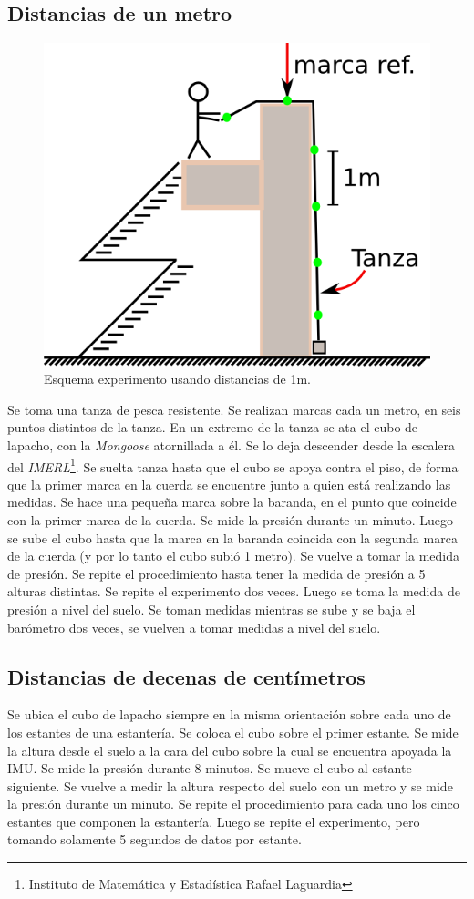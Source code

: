 \documentclass[main]{subfiles}
\begin{document}
\subsection{Distancias de un metro}

\begin{figure}
\hspace{20pt}
  \includegraphics[width=.5\textwidth]{./pics_barom/imerl.png}
  \caption{Esquema experimento usando distancias de 1m.}
  \label{fig:imerl.png}
\end{figure}

Se toma una tanza de pesca resistente. Se realizan marcas cada un metro, en seis puntos distintos de la tanza. En un extremo de la tanza se ata el cubo de lapacho, con la \emph{Mongoose} atornillada a él. Se lo deja descender desde la escalera del \emph{IMERL}\footnote{Instituto de Matemática y Estadística Rafael Laguardia}. Se suelta tanza hasta que el cubo se apoya contra el piso, de forma que la primer marca en la cuerda se encuentre junto a quien está realizando las medidas. Se hace una pequeña marca sobre la baranda, en el punto que coincide con la primer marca de la cuerda. Se mide la presión durante un minuto. Luego se sube el cubo hasta que la marca en la baranda coincida con la segunda marca de la cuerda (y por lo tanto el cubo subió 1 metro). Se vuelve a tomar la medida de presión. Se repite el procedimiento hasta tener la medida de presión a 5 alturas distintas. 
Se repite el experimento dos veces. Luego se toma la medida de presión a nivel del suelo. Se toman medidas mientras se sube y se baja el barómetro dos veces, se vuelven a tomar medidas a nivel del suelo.

\subsection{Distancias de decenas de centímetros}

Se ubica el cubo de lapacho siempre en la misma orientación sobre cada uno de los estantes de una estantería. Se coloca el cubo sobre el primer estante. Se mide la altura desde el suelo a la cara del cubo sobre la cual se encuentra apoyada la IMU. Se mide la presión durante 8 minutos. Se mueve el cubo al estante siguiente. Se vuelve a medir la altura respecto del suelo con un metro y se mide la presión durante un minuto. Se repite el procedimiento para cada uno los cinco estantes que componen la estantería. Luego se repite el experimento, pero tomando solamente 5 segundos de datos por estante.
\end{document}
